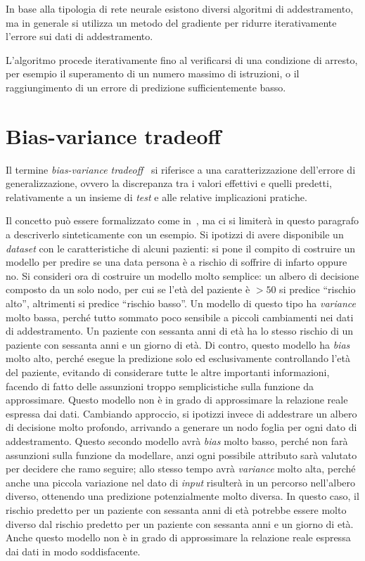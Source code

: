 In base alla tipologia di rete neurale esistono diversi algoritmi di addestramento, ma in generale si utilizza un metodo del gradiente per ridurre iterativamente l'errore sui dati di addestramento.

L'algoritmo procede iterativamente fino al verificarsi di una condizione di arresto, per esempio il superamento di un numero massimo di istruzioni, o il raggiungimento di un errore di predizione sufficientemente basso.

\section{Bias-variance tradeoff}\label{sec:bias_variance_tradeoff}
Il termine \emph{bias-variance tradeoff}~\cite{elements-of-statistical-learning} si riferisce a una caratterizzazione dell'errore di generalizzazione, ovvero la discrepanza tra i valori effettivi e quelli predetti, relativamente a un insieme di \emph{test} e alle relative implicazioni pratiche.

Il concetto può essere formalizzato come in~\cite{elements-of-statistical-learning}, ma ci si limiterà in questo paragrafo a descriverlo sinteticamente con un esempio.
Si ipotizzi di avere disponibile un \emph{dataset} con le caratteristiche di alcuni pazienti: si pone il compito di costruire un modello per predire se una data persona è a rischio di soffrire di infarto oppure no.
Si consideri ora di costruire un modello molto semplice: un albero di decisione composto da un solo nodo, per cui se l'età del paziente è $>50$ si predice ``rischio alto'', altrimenti si predice ``rischio basso''.
Un modello di questo tipo ha \emph{variance} molto bassa, perché tutto sommato poco sensibile a piccoli cambiamenti nei dati di addestramento. Un paziente con sessanta anni di età ha lo stesso rischio di un paziente con sessanta anni e un giorno di età.
Di contro, questo modello ha \emph{bias} molto alto, perché esegue la predizione solo ed esclusivamente controllando l'età del paziente, evitando di considerare tutte le altre importanti informazioni, facendo di fatto delle assunzioni troppo semplicistiche sulla funzione da approssimare. 
Questo modello non è in grado di approssimare la relazione reale espressa dai dati.
Cambiando approccio, si ipotizzi invece di addestrare un albero di decisione molto profondo, arrivando a generare un nodo foglia per ogni dato di addestramento.
Questo secondo modello avrà \emph{bias} molto basso, perché non farà assunzioni sulla funzione da modellare, anzi ogni possibile attributo sarà valutato per decidere che ramo seguire; allo stesso tempo avrà \emph{variance} molto alta, perché anche una piccola variazione nel dato di \emph{input} risulterà in un percorso nell'albero diverso, ottenendo una predizione potenzialmente molto diversa.
In questo caso, il rischio predetto per un paziente con sessanta anni di età potrebbe essere molto diverso dal rischio predetto per un paziente con sessanta anni e un giorno di età.
Anche questo modello non è in grado di approssimare la relazione reale espressa dai dati in modo soddisfacente.

